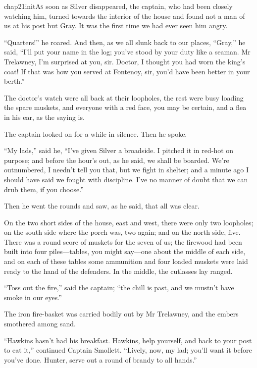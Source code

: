 
   \lettrine[lines=4,image=true]{chap21initA}{s} soon as Silver disappeared, the captain, who had been closely watching him, turned towards the interior of the house and found not a man of us at his post but Gray. It was the first time we had ever seen him angry.

\enquote{Quarters!} he roared. And then, as we all slunk back to our places, \enquote{Gray,} he said, \enquote{I’ll put your name in the log; you’ve stood by your duty like a seaman. Mr Trelawney, I’m surprised at you, sir. Doctor, I thought you had worn the king’s coat! If that was how you served at Fontenoy, sir, you’d have been better in your berth.}

The doctor’s watch were all back at their loopholes, the rest were busy loading the spare muskets, and everyone with a red face, you may be certain, and a flea in his ear, as the saying is.

The captain looked on for a while in silence. Then he spoke.

\enquote{My lads,} said he, \enquote{I’ve given Silver a broadside. I pitched it in red-hot on purpose; and before the hour’s out, as he said, we shall be boarded. We’re outnumbered, I needn’t tell you that, but we fight in shelter; and a minute ago I should have said we fought with discipline. I’ve no manner of doubt that we can drub them, if you choose.}

Then he went the rounds and saw, as he said, that all was clear.

On the two short sides of the house, east and west, there were only two loopholes; on the south side where the porch was, two again; and on the north side, five. There was a round score of muskets for the seven of us; the firewood had been built into four piles---tables, you might say---one about the middle of each side, and on each of these tables some ammunition and four loaded muskets were laid ready to the hand of the defenders. In the middle, the cutlasses lay ranged.

\enquote{Toss out the fire,} said the captain; \enquote{the chill is past, and we mustn’t have smoke in our eyes.}

The iron fire-basket was carried bodily out by Mr Trelawney, and the embers smothered among sand.

\enquote{Hawkins hasn’t had his breakfast. Hawkins, help yourself, and back to your post to eat it,} continued Captain Smollett. \enquote{Lively, now, my lad; you’ll want it before you’ve done. Hunter, serve out a round of brandy to all hands.}

